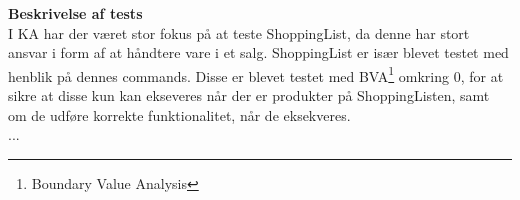 \textbf{Beskrivelse af tests}\\
I \gls{KA} har der været stor fokus på at teste ShoppingList, da denne har stort ansvar i form af at håndtere vare i et salg. ShoppingList er især blevet testet med henblik på dennes commands. Disse er blevet testet med BVA\footnote{Boundary Value Analysis} omkring 0, for at sikre at disse kun kan ekseveres når der er produkter på ShoppingListen, samt om de udføre korrekte funktionalitet, når de eksekveres.\\
...